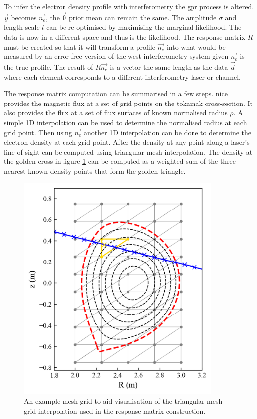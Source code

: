 To infer the electron density profile with interferometry the \gls{gpr} process is altered. $\vec{y}$ becomes $\vec{n_e}$, the $\vec{0}$ prior mean can remain the same. The amplitude $\sigma$ and length-scale $l$ can be re-optimised by maximising the marginal likelihood. The data is now in a different space and thus is the likelihood. The response matrix $R$ must be created so that it will transform a profile $\vec{n_e}$ into what would be measured by an error free version of the \gls{west} interferometry system given $\vec{n_e}$ is the true profile. The result of $R \vec{n_e}$ is a vector the same length as the data $\vec{d}$ where each element corresponds to a different interferometry laser or channel. 

The response matrix computation can be summarised in a few steps. \Gls{nice} provides the magnetic flux at a set of grid points on the tokamak cross-section. It also provides the flux at a set of flux surfaces of known normalised radius $\rho$. A simple 1D interpolation can be used to determine the normalised radius at each grid point. Then using $\vec{n_e}$ another 1D interpolation can be done to determine the electron density at each grid point. After the density at any point along a laser's line of sight can be computed using triangular mesh interpolation. The density at the golden cross in figure \ref{fig:meshtriangle} can be computed as a weighted sum of the three nearest known density points that form the golden triangle.

\begin{figure}
  \centering
  \includegraphics[width=10cm]{images/meshtriangle.png}
  \caption{An example mesh grid to aid visualisation of the triangular mesh grid interpolation used in the response matrix construction.}
  \label{fig:meshtriangle}
\end{figure}

